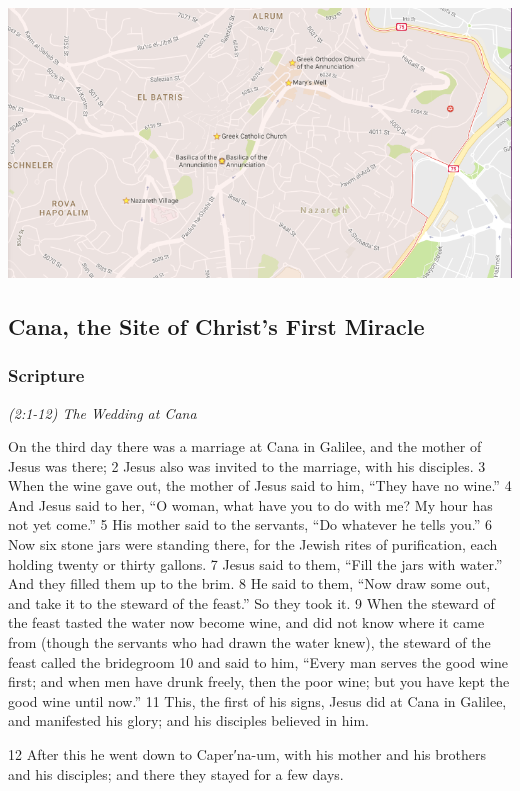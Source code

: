 \documentclass[letterpaper]{report}
\begin{document}
\includegraphics[width=\textwidth]{Nazareth}


\clearpage
\subsection{Cana, the Site of Christ's First Miracle}
\begin{multicols}{2}
	\mbox{}
\end{multicols}
\subsubsection{Scripture}

{\centering
	\emph{(2:1-12) The Wedding at Cana}\\
}
\begin{multicols}{2}
On the third day there was a marriage at Cana in Galilee, and the mother of Jesus was there; 2 Jesus also was invited to the marriage, with his disciples. 3 When the wine gave out, the mother of Jesus said to him, “They have no wine.” 4 And Jesus said to her, “O woman, what have you to do with me? My hour has not yet come.” 5 His mother said to the servants, “Do whatever he tells you.” 6 Now six stone jars were standing there, for the Jewish rites of purification, each holding twenty or thirty gallons. 7 Jesus said to them, “Fill the jars with water.” And they filled them up to the brim. 8 He said to them, “Now draw some out, and take it to the steward of the feast.” So they took it. 9 When the steward of the feast tasted the water now become wine, and did not know where it came from (though the servants who had drawn the water knew), the steward of the feast called the bridegroom 10 and said to him, “Every man serves the good wine first; and when men have drunk freely, then the poor wine; but you have kept the good wine until now.” 11 This, the first of his signs, Jesus did at Cana in Galilee, and manifested his glory; and his disciples believed in him.

12 After this he went down to Caper′na-um, with his mother and his brothers and his disciples; and there they stayed for a few days.
\end{multicols}
\end{document}
